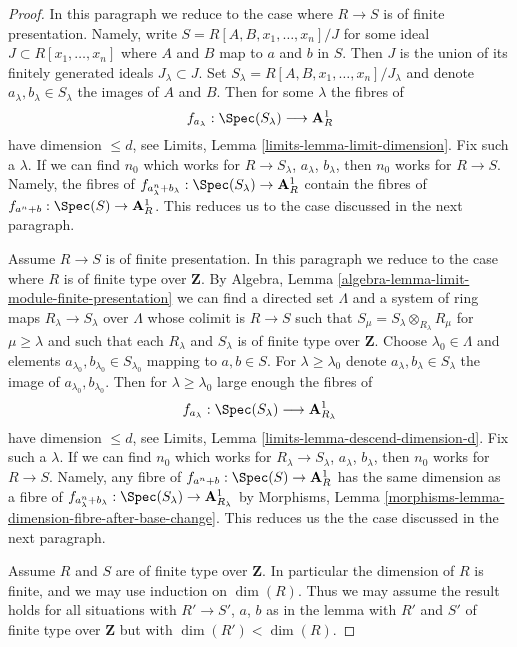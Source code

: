 \begin{proof}
In this paragraph we reduce to the case where $R \to S$ is of finite
presentation. Namely, write $S = R[A, B, x_1, \ldots, x_n]/J$ for some ideal
$J \subset R[x_1, \ldots, x_n]$ where $A$ and $B$ map to $a$ and $b$ in $S$.
Then $J$ is the union of its finitely generated ideals $J_\lambda \subset J$.
Set $S_\lambda = R[A, B, x_1, \ldots, x_n]/J_\lambda$ and
denote $a_\lambda, b_\lambda \in S_\lambda$ the images of $A$ and $B$.
Then for some $\lambda$ the fibres of
$$
f_{a_\lambda} : \Spec(S_\lambda) \longrightarrow \mathbf{A}^1_R
$$
have dimension $\leq d$, see Limits, Lemma \ref{limits-lemma-limit-dimension}.
Fix such a $\lambda$. If we can find $n_0$ which works for $R \to S_\lambda$,
$a_\lambda$, $b_\lambda$, then $n_0$ works for $R \to S$. Namely, the fibres
of $f_{a_\lambda^n + b_\lambda} : \Spec(S_\lambda) \to \mathbf{A}^1_R$
contain the fibres of $f_{a^n + b} : \Spec(S) \to \mathbf{A}^1_R$.
This reduces us to the case discussed in the next paragraph.

\medskip\noindent
Assume $R \to S$ is of finite presentation. In this paragraph we reduce
to the case where $R$ is of finite type over $\mathbf{Z}$. By
Algebra, Lemma \ref{algebra-lemma-limit-module-finite-presentation}
we can find a directed set $\Lambda$ and a system of ring maps
$R_\lambda \to S_\lambda$ over $\Lambda$ whose colimit is
$R \to S$ such that $S_\mu = S_\lambda \otimes_{R_\lambda} R_\mu$
for $\mu \geq \lambda$ and such that each $R_\lambda$ and $S_\lambda$
is of finite type over $\mathbf{Z}$. Choose $\lambda_0 \in \Lambda$ and
elements $a_{\lambda_0}, b_{\lambda_0} \in S_{\lambda_0}$ mapping to
$a, b \in S$. For $\lambda \geq \lambda_0$ denote
$a_\lambda, b_\lambda \in S_\lambda$
the image of $a_{\lambda_0}, b_{\lambda_0}$.
Then for $\lambda \geq \lambda_0$ large enough the fibres of
$$
f_{a_\lambda} : 
\Spec(S_\lambda) \longrightarrow \mathbf{A}^1_{R_\lambda}
$$
have dimension $\leq d$, see
Limits, Lemma \ref{limits-lemma-descend-dimension-d}.
Fix such a $\lambda$. If we can find $n_0$ which works for
$R_\lambda \to S_\lambda$, $a_\lambda$, $b_\lambda$, then $n_0$
works for $R \to S$. Namely, any fibre of
$f_{a^n + b} : \Spec(S) \to \mathbf{A}^1_R$
has the same dimension as a fibre of
$f_{a_\lambda^n + b_\lambda} : \Spec(S_\lambda) \to \mathbf{A}^1_{R_\lambda}$
by Morphisms, Lemma \ref{morphisms-lemma-dimension-fibre-after-base-change}.
This reduces us the the case discussed in the next paragraph.

\medskip\noindent
Assume $R$ and $S$ are of finite type over $\mathbf{Z}$. In particular
the dimension of $R$ is finite, and we may use induction on $\dim(R)$.
Thus we may assume the result holds for all situations with
$R' \to S'$, $a$, $b$ as in the lemma with $R'$ and $S'$ of finite type
over $\mathbf{Z}$ but with $\dim(R') < \dim(R)$.


\end{proof}
